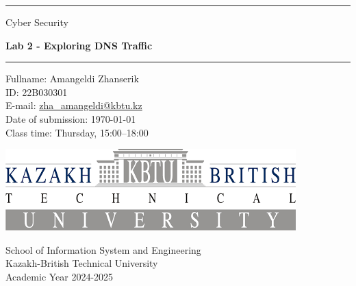 \documentclass[12pt]{article}
\begin{document}
\begin{titlepage}
    \centering

    \vspace*{1cm}

    \rule{\textwidth}{1pt}

    \vspace{2\baselineskip}

    {\huge  Cyber Security } \\

    \vspace{1\baselineskip}

    {\huge \textbf{ Lab 2 - Exploring DNS Traffic }}

    \vspace{2\baselineskip}

    \rule{\textwidth}{1pt}

    \vspace{1cm}

    \large

    \begin{flushleft}
        \begin{minipage}{.8\textwidth}
            \raggedright
            Fullname: Amangeldi Zhanserik \\
            ID: 22B030301 \\
            E-mail: {\normalsize \url{zha_amangeldi@kbtu.kz}} \\
            Date of submission: \today \\
            Class time: Thursday, 15:00--18:00 \\
        \end{minipage}%
    \end{flushleft}

    \vspace{2cm}

    \includegraphics[width=.7\textwidth]{logo-kbtu.png}

    \vfill

    School of Information System and Engineering \\
    Kazakh-British Technical University \\
    Academic Year 2024-2025 \\
\end{titlepage}
\end{document}
